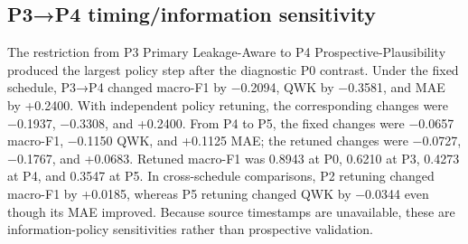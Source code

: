 \documentclass[information,article,submit,pdftex,moreauthors]{Definitions/mdpi}
\begin{document}
\begin{table}[H]
\centering\scriptsize
\caption{Five-repetition nested-CV summaries}
\label{tab:5}
\end{table}

\subsection{P3→P4 timing/information sensitivity}

The restriction from P3 Primary Leakage-Aware to P4 Prospective-Plausibility produced the largest policy step after the diagnostic P0 contrast. Under the fixed schedule, P3→P4 changed macro-F1 by −0.2094, QWK by −0.3581, and MAE by +0.2400. With independent policy retuning, the corresponding changes were −0.1937, −0.3308, and +0.2400. From P4 to P5, the fixed changes were −0.0657 macro-F1, −0.1150 QWK, and +0.1125 MAE; the retuned changes were −0.0727, −0.1767, and +0.0683. Retuned macro-F1 was 0.8943 at P0, 0.6210 at P3, 0.4273 at P4, and 0.3547 at P5. In cross-schedule comparisons, P2 retuning changed macro-F1 by +0.0185, whereas P5 retuning changed QWK by −0.0344 even though its MAE improved. Because source timestamps are unavailable, these are information-policy sensitivities rather than prospective validation.

\begin{table}[H]
\centering\scriptsize
\caption{Fixed-schedule and independently retuned policy results}
\label{tab:6}
\end{table}
\end{document}
